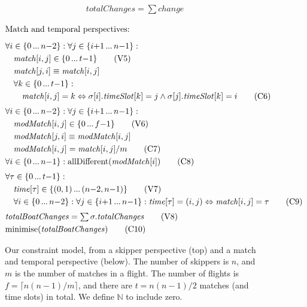 \documentclass{llncs}
\newcommand{\match}{\mathit{match}}
\newcommand{\timeSlot}{\mathit{timeSlot}}
\newcommand{\change}{\mathit{change}}
\newcommand{\totalChanges}{\mathit{totalChanges}}
\newcommand{\totalBoatChanges}{\mathit{totalBoatChanges}}
\newcommand{\modMatch}{\mathit{modMatch}}
\newcommand{\timeVar}{\mathit{time}}
\newcommand{\allDifferent}{\mathrm{allDifferent}}
\newcommand{\minimise}{\mathrm{minimise}}
\newcommand\nldots{\,\hbox to 0.8em{.\hss.\hss.}\,}
\begin{document}
\begin{figure}[p]
\begin{framed}
\begin{align}
    & \totalChanges = \textstyle\sum \change \label{C5} \tag{C5}
\end{align}
\end{framed}\begin{framed}
\begin{align}
    \intertext{Match and temporal perspectives:\smallskip}
    & \forall i \in \{0 \nldots n{-}2\} : \forall j \in \{ i{+}1 \nldots n{-}1 \} : \nonumber \\
    & \hspace*{1em} \match[{i,j}] \in \{0 \nldots t{-}1\} \tag{V5} \label{V5} \\
    & \hspace*{1em} \match[{j,i}] \equiv \match[{i,j}] \nonumber \\
    & \hspace*{1em} \forall k \in \{0 \nldots t{-}1 \} : \nonumber \\
    & \hspace*{2em} \match[{i,j}] = k \Leftrightarrow \sigma[{i}].\timeSlot[{k}] = j \wedge \sigma[{j}].\timeSlot[{k}] = i \tag{C6} \label{C6} \\[0.1cm]
    & \forall i \in \{0 \nldots n{-}2\} : \forall j \in \{ i{+}1 \nldots n{-}1 \} \nonumber : \\
    & \hspace*{1em} \modMatch[{i,j}] \in \{0 \nldots f{-}1\} \label{V6} \tag{V6} \\
    & \hspace*{1em} \modMatch[{j,i}] \equiv \modMatch[{i,j}] \nonumber  \\
    & \hspace*{1em} \modMatch[{i,j}] = \match[{i,j}] / m \tag{C7} \label{C7} \\
    & \forall i \in \{0 \nldots n{-}1 \} : \allDifferent(\modMatch[{i}]) \tag{C8} \label{C8} \\[0.1cm]
    & \forall \tau \in \{0 \nldots t{-}1 \} : \nonumber \\
    & \hspace*{1em} \timeVar[{\tau}] \in \{(0,1) \nldots (n{-}2,n{-}1)\} \tag{V7} \label{V7} \\
    & \hspace*{1em} \forall i \in \{0 \nldots n{-}2\} : \forall  j \in \{ i{+}1 \nldots n{-}1 \} : \timeVar[{\tau}] = (i,j) \Leftrightarrow \match[{i,j}] = \tau \tag{C9} \label{C9} \\[0.1cm]
    & \totalBoatChanges = \textstyle\sum \sigma.\totalChanges \label{V8} \tag{V8} \\
    & \minimise(\totalBoatChanges) \label{C10} \tag{C10}
\end{align}
\end{framed}
\caption{Our constraint model, from a skipper perspective (top) and a match and temporal perspective
(below). The number of skippers is $n$, and $m$ is the number of matches in a flight. The number of
flights is $f = \lceil n(n-1)/m \rceil$, and there are $t = n(n-1)/2$ matches (and time slots) in
total. We define $\mathbb{N}$ to include zero.}\label{model:stage1}
\end{figure}
\end{document}
